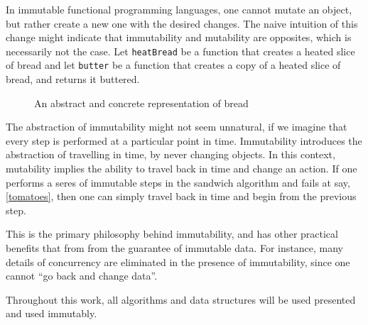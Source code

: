 In immutable functional programming languages, one cannot mutate an object, but rather create a new one with the desired changes.
The naive intuition of this change might indicate that immutability and mutability are opposites, which is necessarily not the case.
Let \texttt{heatBread} be a function that creates a heated slice of bread and let \texttt{butter} be a function that creates a copy of a heated slice of bread, and returns it buttered.
\begin{figure}
\centering 
  \caption{An abstract and concrete representation of bread}
\end{figure}
The abstraction of immutability might not seem unnatural, if we imagine that every step is performed at a particular point in time.
Immutability introduces the abstraction of travelling in time, by never changing objects.
In this context, mutability implies the ability to travel back in time and change an action.
If one performs a seres of immutable steps in the sandwich algorithm and fails at say, \autoref{tomatoes}, then one can simply travel back in time and begin from the previous step.

This is the primary philosophy behind immutability, and has other practical benefits that from from the guarantee of immutable data.
For instance, many details of concurrency are eliminated in the presence of immutability, since one cannot ``go back and change data''.

Throughout this work, all algorithms and data structures will be used presented and used immutably.


